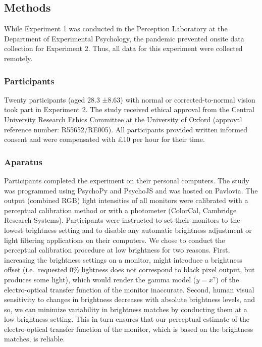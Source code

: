 \documentclass[a4paper, nobind]{templates/ociamthesis}
\begin{document}
\hypertarget{methods-7}{%
\subsection{Methods}\label{methods-7}}

While Experiment 1 was conducted in the Perception Laboratory at the Department of Experimental Psychology, the pandemic prevented onsite data collection for Experiment 2. Thus, all data for this experiment were collected remotely.

\hypertarget{participants-5}{%
\subsubsection{Participants}\label{participants-5}}

Twenty participants (aged 28.3 ±8.63) with normal or corrected-to-normal vision took part in Experiment 2. The study received ethical approval from the Central University Research Ethics Committee at the University of Oxford (approval reference number: R55652/RE005). All participants provided written informed consent and were compensated with £10 per hour for their time.

\hypertarget{aparatus}{%
\subsubsection{Aparatus}\label{aparatus}}

Participants completed the experiment on their personal computers. The study was programmed using PsychoPy \autocite{peirce2007} and PsychoJS and was hosted on Pavlovia. The output (combined RGB) light intensities of all monitors were calibrated with a perceptual calibration method \autocite[half tone pattern matching,][]{xiao2011} or with a photometer (ColorCal, Cambridge Research Systems). Participants were instructed to set their monitors to the lowest brightness setting and to disable any automatic brightness adjustment or light filtering applications on their computers. We chose to conduct the perceptual calibration procedure at low brightness for two reasons. First, increasing the brightness settings on a monitor, might introduce a brightness offset (i.e.~requested 0\% lightness does not correspond to black pixel output, but produces some light), which would render the gamma model (\(y=x^{\gamma}\)) of the electro-optical transfer function of the monitor inaccurate. Second, human visual sensitivity to changes in brightness decreases with absolute brightness levels, and so, we can minimize variability in brightness matches by conducting them at a low brightness setting. This in turn ensures that our perceptual estimate of the electro-optical transfer function of the monitor, which is based on the brightness matches, is reliable.
\end{document}
